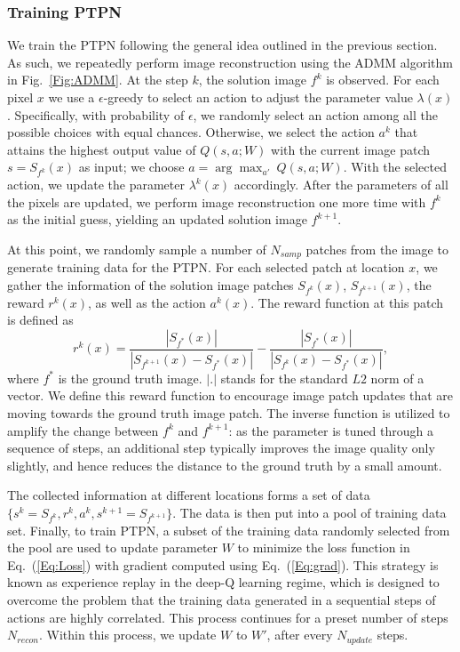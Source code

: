 \documentclass[journal]{IEEEtran}
\begin{document}
\subsubsection{Training PTPN}

We train the PTPN following the general idea outlined in the previous section. As such, we repeatedly perform image reconstruction using the ADMM algorithm in Fig.~\ref{Fig:ADMM}. At the step $k$, the solution image $f^k$ is observed. For each pixel $x$ we use a $\epsilon$-greedy to select an action to adjust the parameter value $\lambda(x)$. Specifically, with probability of $\epsilon$, we randomly select an action among all the possible choices with equal chances. Otherwise, we select the action $a^k$ that attains the highest output value of $Q(s,a;W)$ with the current image patch $s=S_{f^k}(x)$ as input; we choose $a =\arg\max_{a'}~Q(s,a;W)$. With the selected action, we update the parameter $\lambda^k(x)$ accordingly. After the parameters of all the pixels are updated, we perform image reconstruction one more time with $f^k$ as the initial guess, yielding an updated solution image $f^{k+1}$.

At this point, we randomly sample a number of $N_{samp}$ patches from the image  to generate training data for the PTPN. For each selected patch at location $x$, we gather the information of the solution image patches $S_{f^{k}}(x)$, $S_{f^{k+1}}(x)$,  the reward $r^k(x)$, as well as the action $a^k(x)$. The reward function at this patch is defined as 
\begin{equation}
r^k(x) = \frac{|S_{f^*}(x)|}{|S_{f^{k+1}}(x)-S_{f^*}(x)|}-\frac{|S_{f^*}(x)|}{|S_{f^{k}}(x)-S_{f^*}(x)|},
\end{equation}
where $f^*$ is the ground truth image. $|.|$ stands for the standard $L2$ norm of a vector.  We define this reward function to encourage image patch updates that are moving towards the ground truth image patch. The inverse function is utilized to amplify the change between $f^k$ and $f^{k+1}$: as the parameter is tuned through a sequence of steps, an additional step typically improves the image quality only slightly, and hence reduces the distance to the ground truth by a small amount. 

The collected information at different locations forms a set of data $\{s^k=S_{f^{k}}, r^k, a^k, s^{k+1}=S_{f^{k+1}}\}$. The data is then put into a pool of training data set. Finally, to train PTPN, a subset of the training data randomly selected from the pool are used to update parameter $W$ to minimize the loss function in Eq.~(\ref{Eq:Loss}) with gradient computed using Eq.~(\ref{Eq:grad}). This strategy is known as experience replay in the deep-Q learning regime, which is designed to overcome the problem that the training data generated in a sequential steps of actions are highly correlated\cite{Mnih:Arxiv:2013,Mnih:Nature:2015}. This process continues for a preset number of steps $N_{recon}$. Within this process, we update $W$ to $W'$, after every $N_{update}$ steps.
\end{document}
